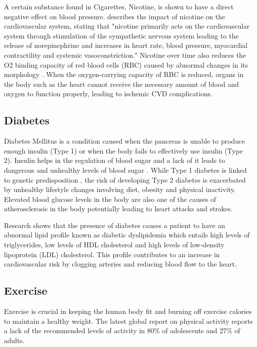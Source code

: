 \documentclass[12pt, a4paper,twoside]{report}
\numberwithin{equation}{chapter}
\begin{document}
A certain substance found in Cigarettes, Nicotine, is shown to have a direct negative effect on blood pressure. \parencite{Price_Martinez_2020} describes the impact of nicotine on the cardiovascular system, stating that "nicotine primarily acts on the cardiovascular system through stimulation of the sympathetic nervous system leading to the release of norepinephrine and increases in heart rate, blood pressure, myocardial contractility and systemic vasoconstriction." Nicotine over time also reduces the O2 binding capacity of red blood cells (RBC) caused by abnormal changes in its morphology \parencite{Aldosari_Ahmadal_2020}. When the oxygen-carrying capacity of RBC is reduced, organs in the body such as the heart cannot receive the necessary amount of blood and oxygen to function properly, leading to ischemic CVD complications.

\subsection{Diabetes}
Diabetes Mellitus is a condition caused when the pancreas is unable to produce enough insulin (Type 1) or when the body fails to effectively use insulin (Type 2). Insulin helps in the regulation of blood sugar and a lack of it leads to dangerous and unhealthy levels of blood sugar \parencite{Society_2023}. While Type 1 diabetes is linked to genetic predisposition \parencite{Simmons_2015}, the risk of developing Type 2 diabetes is exacerbated by unhealthy lifestyle changes involving diet, obesity and physical inactivity. Elevated blood glucose levels in the body are also one of the causes of atherosclerosis in the body potentially leading to heart attacks and strokes.

Research shows that the presence of diabetes causes a patient to have an abnormal lipid profile known as diabetic dyslipidemia \parencite{Bhowmik_Siddiquee2018} which entails high levels of triglycerides, low levels of HDL cholesterol and high levels of low-density lipoprotein (LDL) cholesterol. This profile contributes to an increase in cardiovascular risk by clogging arteries and reducing blood flow to the heart.

\subsection{Exercise}
Exercise is crucial in keeping the human body fit and burning off exercise calories to maintain a healthy weight. The latest global report on physical activity \parencite{who2022} reports a lack of the recommended levels of activity in 80\% of adolescents and 27\% of adults.
\end{document}
